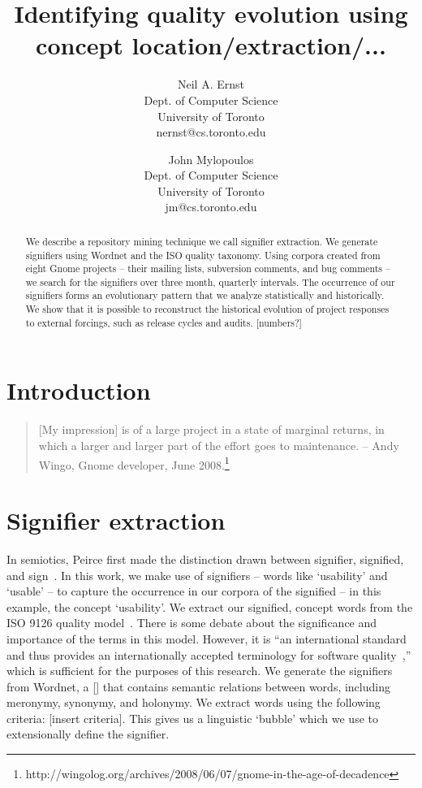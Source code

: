 \documentclass[conference, compsoc]{IEEEtran}
\begin{document}


\title{Identifying quality evolution using concept location/extraction/...}
\author{
Neil A. Ernst\\Dept. of Computer Science\\University of Toronto\\nernst@cs.toronto.edu \and
John Mylopoulos\\Dept. of Computer Science\\University of Toronto\\jm@cs.toronto.edu }

\maketitle

\begin{abstract}
We describe a repository mining technique we call signifier extraction. We generate signifiers using Wordnet and the ISO quality taxonomy. Using corpora created from eight Gnome projects -- their mailing lists, subversion comments, and bug comments -- we search for the signifiers over three month, quarterly intervals. The occurrence of our signifiers forms an evolutionary pattern that we analyze statistically and historically. We show that it is possible to reconstruct the historical evolution of project responses to external forcings, such as release cycles and audits. [numbers?]
\end{abstract}

\section{Introduction}\label{sect:introduction}
\begin{quote}[My impression] is of a large project in a state of marginal returns, in which a larger and larger part of the effort goes to maintenance. -- Andy Wingo, Gnome developer, June 2008.\footnote{http://wingolog.org/archives/2008/06/07/gnome-in-the-age-of-decadence}\end{quote}
	
\section{Signifier extraction}
In semiotics, Peirce first made the distinction drawn between signifier, signified, and sign~\cite{atkin2006}. In this work, we make use of signifiers -- words like `usability' and `usable' -- to capture the occurrence in our corpora of the signified -- in this example, the concept `usability'. We extract our signified, concept words from the ISO 9126 quality model~\cite{iso9126}. There is some debate about the significance and importance of the terms in this model. However, it is ``an international standard and thus provides an internationally accepted terminology for software quality~\cite[p. 58]{Boegh2008},'' which is sufficient for the purposes of this research. We generate the signifiers from Wordnet, a [] that contains semantic relations between words, including meronymy, synonymy, and holonymy. We extract words using the following criteria: [insert criteria]. This gives us a linguistic `bubble' which we use to extensionally define the signifier.

\begin{footnotesize}

\end{footnotesize}
\end{document}
